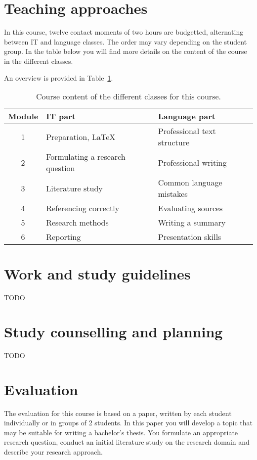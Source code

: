 \section{Teaching approaches}
\label{sec:teachingapproach}

In this course, twelve contact moments of two hours are budgetted, alternating between IT and language classes. The order may vary depending on the student group. In the table below you will find more details on the content of the course in the different classes. 

An overview is provided in Table~\ref{tab:planning}.

\begin{table}
  \centering\begin{tabular}{cll}
    \toprule
    \textbf{Module} & \textbf{IT part}               & \textbf{Language part}                   \\
    \midrule
    1               & Preparation, {\LaTeX}        & Professional text structure \\
    2               & Formulating a research question & Professional writing     \\
    3               & Literature study               & Common language mistakes                 \\
    4               & Referencing correctly              & Evaluating sources   \\
    5               & Research methods             & Writing a summary          \\
    6               & Reporting                    & Presentation skills       \\
  \end{tabular}
  \caption{\label{tab:planning}Course content of the different classes for this course.}
\end{table}

\section{Work and study guidelines}
\label{sec:workstudyguidelines}

TODO

\section{Study counselling and planning}
\label{sec:studycounsellingplanning}

TODO

\section{Evaluation}
\label{sec:evaluation}
The evaluation for this course is based on a paper, written by each student individually or in groups of 2 students. In this paper you will develop a topic that may be suitable for writing a bachelor's thesis. You formulate an appropriate research question, conduct an initial literature study on the research domain and describe your research approach.

